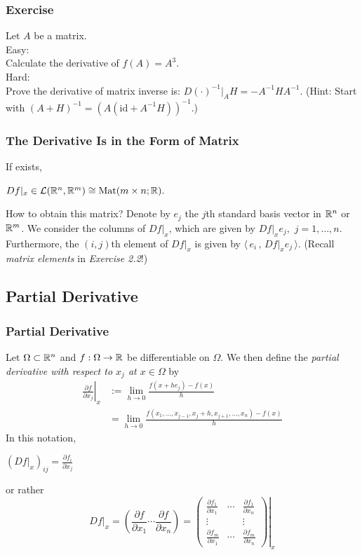 \documentclass[12pt, t]{beamer}
\renewcommand{\emph}[1]{{\color{Turquoise3}\textsl{#1}}}
\newcommand{\nullspace}{~\\[15pt]}
\newcommand{\scp}[2]{\langle\,#1\,,\,#2\,\rangle} \newcommand{\scpp}{\langle\,\cdot\,,\,\cdot\,\rangle}
\begin{document}
\begin{frame}
    \frametitle{Exercise}
    Let $A$ be a matrix.
    \nullspace
    Easy:\\
    Calculate the derivative of $f(A)=A^3$.
    \nullspace
    Hard:\\
    Prove the derivative of matrix inverse is: $D(\cdot)^{-1}|_AH =-A^{-1} H A^{-1} $.
    (Hint: Start with $(A+H)^{-1}=(A(\text{id}+A^{-1}H))^{-1}$.)
\end{frame}

\begin{frame}
    \frametitle{The Derivative Is in the Form of Matrix}
    If exists,
    \begin{center}
        $Df|_x\in\mathcal{L}(\mathbb{R}^n,\mathbb{R}^m)\cong\text{Mat}(m\times n;\mathbb{R}).$
    \end{center}
    How to obtain this matrix? Denote by $e_j$ the $j$th standard basis vector in $\mathbb{R}^n$ or $\mathbb{R}^m$. We consider the columns of $Df|_x$, which are given by $Df|_xe_j,$ $j=1,\ldots,n.$ Furthermore, the $(i,j)$th element of $Df|_x$ is given by $\scp{e_i}{Df|_xe_j}$. (Recall \emph{matrix elements} in \textit{Exercise 2.2}!)
\end{frame}

\subsection{Partial Derivative}
\begin{frame}
    \frametitle{Partial Derivative}
    Let $\Omega\subset\mathbb{R}^n$ and $f:\Omega\to\mathbb{R}$ be dif{}ferentiable on $\Omega$.
    We then define the \emph{partial derivative with
        respect to $x_j$ at $x\in\Omega$} by
    \begin{equation*}
        \begin{split}
            \left.\frac{\partial f}{\partial x_j}\right|_x &:=\lim_{h\to0}\frac{f(x+he_j)-f(x)}{h} \\
            &=\lim_{h\to0}\frac{f(x_1,\ldots,x_{j-1},x_j+h,x_{j+1},\ldots,x_n)-f(x)}{h}
        \end{split}
    \end{equation*}
    In this notation,
    \begin{center}
        $\displaystyle(Df|_x)_{ij}=\frac{\partial f_i}{\partial x_j}$
    \end{center}
    or rather
    \[Df|_x=(\frac{\partial f}{\partial x_1}  \cdots  \frac{\partial f}{\partial x_n})=\left.\begin{pmatrix}
            \frac{\partial f_1}{\partial x_1} & \cdots & \frac{\partial f_1}{\partial x_n} \\
            \vdots                            &        & \vdots                            \\
            \frac{\partial f_m}{\partial x_1} & \cdots & \frac{\partial f_m}{\partial x_n}
        \end{pmatrix}\right|_x\]
\end{frame}
\end{document}

